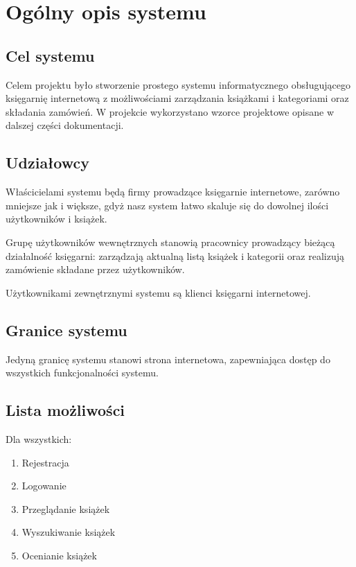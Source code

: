 \documentclass[pdflatex,11pt]{aghdpl}
\author{Marta~Drabarczyk, Krzysztof~Kutt, Michał~Nowak}
\date{2012}
\begin{document}
\titlepages

\tableofcontents
\clearpage


\chapter{Ogólny opis systemu}

\section{Cel systemu}

Celem projektu było stworzenie prostego systemu informatycznego obsługującego księgarnię internetową z możliwościami zarządzania książkami i kategoriami oraz składania zamówień. W projekcie wykorzystano wzorce projektowe opisane w dalszej części dokumentacji.


\section{Udziałowcy}

Właścicielami systemu będą firmy prowadzące księgarnie internetowe, zarówno mniejsze jak i większe, gdyż nasz system łatwo skaluje się do dowolnej ilości użytkowników i książek.

Grupę użytkowników wewnętrznych stanowią pracownicy prowadzący bieżącą działalność księgarni: zarządzają aktualną listą książek i kategorii oraz realizują zamówienie składane przez użytkowników.

Użytkownikami zewnętrznymi systemu są klienci księgarni internetowej.


\section{Granice systemu}

Jedyną granicę systemu stanowi strona internetowa, zapewniająca dostęp do wszystkich funkcjonalności systemu.


\section{Lista możliwości}

Dla wszystkich:
\begin{enumerate}
\item Rejestracja
\item Logowanie
\item Przeglądanie książek
\item Wyszukiwanie książek
\item Ocenianie książek
\end{enumerate}
\end{document}
